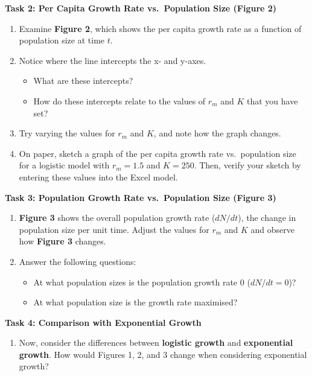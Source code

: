 \documentclass[
  a4paper]{book}
\providecommand{\tightlist}{%
  \setlength{\itemsep}{0pt}\setlength{\parskip}{0pt}}
\begin{document}
\textbf{Task 2: Per Capita Growth Rate vs.~Population Size (Figure 2)}

\begin{enumerate}
\def\labelenumi{\arabic{enumi}.}
\item
  Examine \textbf{Figure 2}, which shows the per capita growth rate as a function of population size at time \(t\).
\item
  Notice where the line intercepts the x- and y-axes.

  \begin{itemize}
  \tightlist
  \item
    What are these intercepts?
  \item
    How do these intercepts relate to the values of \(r_m\) and \(K\) that you have set?
  \end{itemize}
\item
  Try varying the values for \(r_m\) and \(K\), and note how the graph changes.
\item
  On paper, sketch a graph of the per capita growth rate vs.~population size for a logistic model with \(r_m = 1.5\) and \(K = 250\). Then, verify your sketch by entering these values into the Excel model.
\end{enumerate}

\textbf{Task 3: Population Growth Rate vs.~Population Size (Figure 3)}

\begin{enumerate}
\def\labelenumi{\arabic{enumi}.}
\item
  \textbf{Figure 3} shows the overall population growth rate (\(dN/dt\)), the change in population size per unit time. Adjust the values for \(r_m\) and \(K\) and observe how \textbf{Figure 3} changes.
\item
  Answer the following questions:

  \begin{itemize}
  \tightlist
  \item
    At what population sizes is the population growth rate 0 (\(dN/dt = 0\))?
  \item
    At what population size is the growth rate maximised?
  \end{itemize}
\end{enumerate}

\textbf{Task 4: Comparison with Exponential Growth}

\begin{enumerate}
\def\labelenumi{\arabic{enumi}.}
\tightlist
\item
  Now, consider the differences between \textbf{logistic growth} and \textbf{exponential growth}. How would Figures 1, 2, and 3 change when considering exponential growth?
\end{enumerate}
\end{document}
